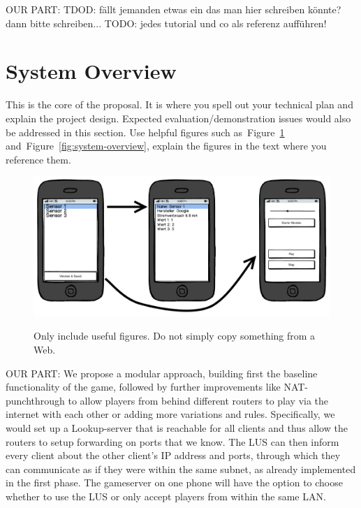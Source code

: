 \documentclass{report}
\newcommand{\lfig}[1]{\label{fig:#1}}
\newcommand{\rfig}[1]{Figure~\ref{fig:#1}}
\begin{document}
OUR PART:
TDOD: fällt jemanden etwas ein das man hier schreiben könnte? dann bitte schreiben...
TODO: jedes tutorial und co als referenz aufführen!


\section{System Overview}

This is the core of the proposal.
It is where you spell out your technical plan and explain the project design.
Expected evaluation/demonstration issues would also be addressed in this section.
Use helpful figures such as~\rfig{example} and~\rfig{system-overview},
explain the figures in the text where you reference them. 


\begin{figure}[h]
	\centering
    \includegraphics[width=\columnwidth]{example}
    \lfig{example}
    \vspace{-5mm} %
	\caption{Only include useful figures. Do not simply copy something from a Web.}
\end{figure}

OUR PART:
We propose a modular approach, building first the baseline functionality of the game, followed by further improvements like NAT-punchthrough to allow players from behind different routers to play via the internet with each other or adding more variations and rules.
Specifically, we would set up a Lookup-server that is reachable for all clients and thus allow the routers to setup forwarding on ports that we know. The LUS can then inform every client about the other client's IP address and ports, through which they can communicate as if they were within the same subnet, as already implemented in the first phase. The gameserver on one phone will have the option to choose whether to use the LUS or only accept players from within the same LAN.
\end{document}
